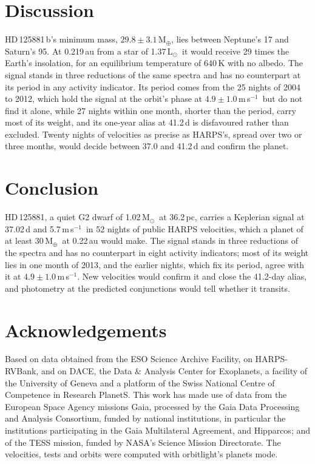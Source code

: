 \documentclass[3p,11pt]{elsarticle}
\newcommand{\ms}{m\,s$^{-1}$}
\newcommand{\Msun}{M$_\odot$}
\newcommand{\Lsun}{L$_\odot$}
\newcommand{\Mearth}{M$_\oplus$}
\begin{document}
\section{Discussion}\label{sec:discussion}

HD\,125881\,b's minimum mass, $29.8 \pm 3.1$\,\Mearth, lies between Neptune's 17 and Saturn's 95. At
0.219\,au from a star of 1.37\,\Lsun\ it would receive 29 times the Earth's insolation, for an
equilibrium temperature of 640\,K with no albedo. The signal stands in three reductions of the same
spectra and has no counterpart at its period in any activity indicator. Its period comes from the 25 nights of 2004 to 2012, which hold the
signal at the orbit's phase at $4.9 \pm 1.0$\,\ms\ but do not find it alone, while 27 nights within one
month, shorter than the period, carry most of its weight, and its one-year alias at 41.2\,d is
disfavoured rather than excluded. Twenty nights of velocities as precise as HARPS's, spread over two or
three months, would decide between 37.0 and 41.2\,d and confirm the planet.

\section{Conclusion}\label{sec:conclusion}

HD\,125881, a quiet G2 dwarf of 1.02\,\Msun\ at 36.2\,pc, carries a Keplerian signal at 37.02\,d and
5.7\,\ms\ in 52 nights of public HARPS velocities, which a planet of at least 30\,\Mearth\ at 0.22\,au
would make. The signal stands in three reductions of the spectra and has no counterpart in eight
activity indicators; most of its weight lies in one month of 2013, and
the earlier nights, which fix its period, agree with it at $4.9 \pm 1.0$\,\ms. New velocities would
confirm it and close the 41.2-day alias, and photometry at the predicted conjunctions would tell
whether it transits.

\section*{Acknowledgements}

Based on data obtained from the ESO Science Archive Facility, on HARPS-RVBank, and on DACE, the Data \&
Analysis Center for Exoplanets, a facility of the University of Geneva and a platform of the Swiss
National Centre of Competence in Research PlanetS. This work has made use of data from the European Space
Agency missions Gaia, processed by the Gaia Data Processing and Analysis Consortium, funded by national
institutions, in particular the institutions participating in the Gaia Multilateral Agreement, and
Hipparcos; and of the TESS mission, funded by NASA's Science Mission Directorate. The velocities, tests
and orbits were computed with orbitlight's planets mode.
\end{document}
